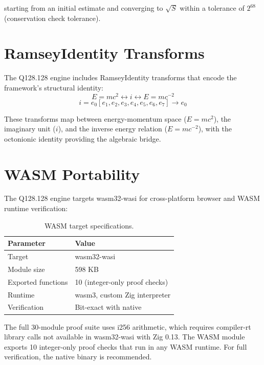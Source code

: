 \documentclass[11pt]{article}
\begin{document}
starting from an initial estimate and converging to $\sqrt{S}$ within a tolerance of $2^{68}$ (conservation check tolerance).

\section{RamseyIdentity Transforms}

The Q128.128 engine includes RamseyIdentity transforms that encode the framework's structural identity:
\begin{equation}
E = mc^2 \leftrightarrow i \leftrightarrow E = mc^{-2}
\end{equation}
\begin{equation}
i = e_0[e_1, e_2, e_3, e_4, e_5, e_6, e_7] \to e_0
\end{equation}

These transforms map between energy-momentum space ($E = mc^2$), the imaginary unit ($i$), and the inverse energy relation ($E = mc^{-2}$), with the octonionic identity providing the algebraic bridge.

\section{WASM Portability}

The Q128.128 engine targets wasm32-wasi for cross-platform browser and WASM runtime verification:

\begin{table}[ht]
\centering
\caption{WASM target specifications.}
\label{tab:wasm}
\begin{tabular}{ll}
\toprule
Parameter & Value \\
\midrule
Target & wasm32-wasi \\
Module size & 598 KB \\
Exported functions & 10 (integer-only proof checks) \\
Runtime & wasm3, custom Zig interpreter \\
Verification & Bit-exact with native \\
\bottomrule
\end{tabular}
\end{table}

\begin{remark}
The full 30-module proof suite uses i256 arithmetic, which requires compiler-rt library calls not available in wasm32-wasi with Zig 0.13. The WASM module exports 10 integer-only proof checks that run in any WASM runtime. For full verification, the native binary is recommended.
\end{remark}
\end{document}
